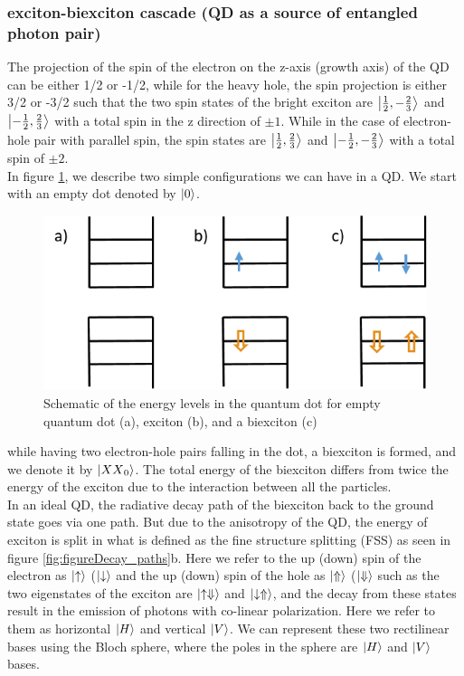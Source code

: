 \subsubsection{exciton-biexciton cascade (QD as a source of entangled photon pair)}
The projection of the spin of the electron on the z-axis (growth axis) of the QD can be either 1/2 or -1/2, while for the heavy hole, the spin 
 projection is either 3/2 or -3/2 such that the two spin states of the bright exciton are $\ket{\frac{1}{2},-\frac{2}{3}}$ and $\ket{-\frac{1}
 {2},\frac{2}{3}}$  with a total spin in the z direction  of $\pm1$. While in the case of electron-hole pair with parallel spin, the spin states are $\ket{\frac{1}{2},\frac{2}{3}}$ and $\ket{-\frac{1}{2},-\frac{2}{3}}$ with a total spin of $\pm2$.\\
	In figure \ref{fig:energy_levels}, we describe two simple configurations we can have in a QD. We start with an empty dot denoted by $\ket{0}$.
	\begin{figure}[H]
		\centering
		\includegraphics[scale=1]{figures/energy-levels.png}
		\caption{Schematic of the energy levels in the quantum dot for empty quantum dot (a), exciton (b), and a biexciton (c)}
		\label{fig:energy_levels}
	\end{figure}
	while having two electron-hole pairs falling in the dot, a biexciton is formed, and we denote it by $\ket{{XX}_0}$. The total energy of the biexciton differs from twice the energy of the exciton due to the interaction between all the particles.\\
	In an ideal QD, the radiative decay path of the biexciton back to the ground state goes via one path. But due to the anisotropy of the QD, the energy of exciton is split in what is defined as the fine structure splitting (FSS) as seen in figure \ref{fig:figureDecay_paths}b. Here we refer to the up (down) spin of the electron as $\ket{\uparrow}$ ($\ket{\downarrow}$ and the up (down) spin of the hole as $\ket{\Uparrow}$ ($\ket{\Downarrow}$ such as the two eigenstates of the exciton are  $\ket{\uparrow\Downarrow}$ and $\ket{\downarrow\Uparrow}$, and the decay from these states result in the emission of photons with co-linear polarization. Here we refer to them as horizontal $\ket{H}$ and vertical $\ket{V}$. We can represent these two rectilinear bases using the Bloch sphere, where the poles in the sphere are $\ket{H}$ and $\ket{V}$ bases.\\
	
